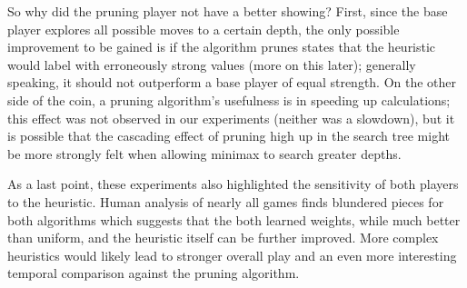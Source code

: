 \documentclass[letterpaper]{article}
\begin{document}
So why did the pruning player not have a better showing?  First, since the base player explores all possible moves to a certain depth, the only possible improvement to be gained is if the algorithm prunes states that the heuristic would label with erroneously strong values (more on this later); generally speaking, it should not outperform a base player of equal strength.  On the other side of the coin, a pruning algorithm's usefulness is in speeding up calculations; this effect was not observed in our experiments (neither was a slowdown), but it is possible that the cascading effect of pruning high up in the search tree might be more strongly felt when allowing minimax to search greater depths.

As a last point, these experiments also highlighted the sensitivity of both players to the heuristic.  Human analysis of nearly all games finds blundered pieces for both algorithms which suggests that the both learned weights, while much better than uniform, and the heuristic itself can be further improved.  More complex heuristics would likely lead to stronger overall play and an even more interesting temporal comparison against the pruning algorithm.
\end{document}
